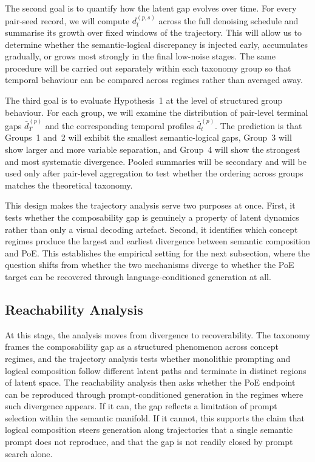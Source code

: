 The second goal is to quantify how the latent gap evolves over time. For every pair-seed record, we will compute $d_t^{(p,s)}$ across the full denoising schedule and summarise its growth over fixed windows of the trajectory. This will allow us to determine whether the semantic-logical discrepancy is injected early, accumulates gradually, or grows most strongly in the final low-noise stages. The same procedure will be carried out separately within each taxonomy group so that temporal behaviour can be compared across regimes rather than averaged away.

The third goal is to evaluate Hypothesis~1 at the level of structured group behaviour. For each group, we will examine the distribution of pair-level terminal gaps $\bar d_T^{(p)}$ and the corresponding temporal profiles $\bar d_t^{(p)}$. The prediction is that Groups~1 and~2 will exhibit the smallest semantic-logical gaps, Group~3 will show larger and more variable separation, and Group~4 will show the strongest and most systematic divergence. Pooled summaries will be secondary and will be used only after pair-level aggregation to test whether the ordering across groups matches the theoretical taxonomy.

This design makes the trajectory analysis serve two purposes at once. First, it tests whether the composability gap is genuinely a property of latent dynamics rather than only a visual decoding artefact. Second, it identifies which concept regimes produce the largest and earliest divergence between semantic composition and PoE. This establishes the empirical setting for the next subsection, where the question shifts from whether the two mechanisms diverge to whether the PoE target can be recovered through language-conditioned generation at all.


\subsection{Reachability Analysis}
\label{subsec:reachability}

At this stage, the analysis moves from divergence to recoverability. 
The taxonomy frames the composability gap as a structured phenomenon across concept regimes, 
and the trajectory analysis tests whether monolithic prompting and logical composition 
follow different latent paths and terminate in distinct regions of latent space. 
The reachability analysis then asks whether the PoE endpoint can be reproduced through 
prompt-conditioned generation in the regimes where such divergence appears. 
If it can, the gap reflects a limitation of prompt selection within the semantic manifold. 
If it cannot, this supports the claim that logical composition steers generation 
along trajectories that a single semantic prompt does not reproduce, 
and that the gap is not readily closed by prompt search alone.

